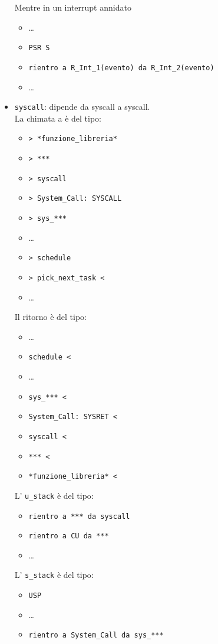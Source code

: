 \documentclass[12pt, a4paper]{report}
\begin{document}
\begin{itemize}
		Mentre in un interrupt annidato 
		\begin{itemize}
			\item \dots
			\item \texttt{PSR S}
			\item \texttt{rientro a R\_Int\_1(evento) da R\_Int\_2(evento)}
			\item \dots
		\end{itemize}
	\item \texttt{syscall}: dipende da syscall a syscall.\\
		La chimata a è del tipo:
		\begin{itemize}
			\item \texttt{> *funzione\_libreria*}
			\item \texttt{> ***}
			\item \texttt{> syscall}
			\item \texttt{> System\_Call: SYSCALL}
			\item \texttt{> sys\_***}
			\item \dots
			\item \texttt{> schedule}
			\item \texttt{> pick\_next\_task <}
			\item \dots
		\end{itemize}
		Il ritorno è del tipo:
		\begin{itemize}
			\item \dots
			\item \texttt{schedule <}
			\item \dots
			\item \texttt{sys\_*** <}
			\item \texttt{System\_Call: SYSRET <}
			\item \texttt{syscall <}
			\item \texttt{*** <}
			\item \texttt{*funzione\_libreria* <}
		\end{itemize}
		L' \texttt{u\_stack} è del tipo:
		\begin{itemize}
			\item \texttt{rientro a *** da syscall}
			\item \texttt{rientro a CU da ***}
			\item \dots
		\end{itemize}
		L' \texttt{s\_stack} è del tipo:
		\begin{itemize}
			\item \texttt{USP}
			\item \dots
			\item \texttt{rientro a System\_Call da sys\_***}

\end{itemize}
\end{itemize}
\end{document}
